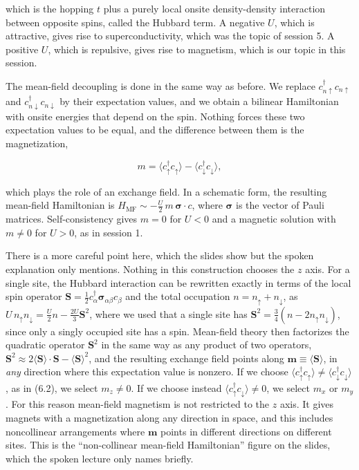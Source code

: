 which is the hopping $t$ plus a purely local onsite density-density interaction between opposite
spins, called the Hubbard term. A negative $U$, which is attractive, gives rise to superconductivity,
which was the topic of session 5. A positive $U$, which is repulsive, gives rise to magnetism, which is
our topic in this session.

The mean-field decoupling is done in the same way as before. We replace
$c_{n\uparrow}^\dagger c_{n\uparrow}$ and $c_{n\downarrow}^\dagger c_{n\downarrow}$ by their
expectation values, and we obtain a bilinear Hamiltonian with onsite energies that depend on the spin.
Nothing forces these two expectation values to be equal, and the difference between them is the
magnetization,

\begin{equation}
m = \langle c_\uparrow^\dagger c_\uparrow\rangle - \langle c_\downarrow^\dagger c_\downarrow\rangle,
\end{equation}

which plays the role of an exchange field. In a schematic form, the resulting mean-field Hamiltonian is
$H_\text{MF} \sim -\tfrac{U}{2}\, m\, \boldsymbol\sigma\cdot c$, where $\boldsymbol\sigma$ is the
vector of Pauli matrices. Self-consistency gives $m=0$ for $U<0$ and a magnetic solution with
$m\neq 0$ for $U>0$, as in session 1.

There is a more careful point here, which the slides show but the spoken explanation only mentions.
Nothing in this construction chooses the $z$ axis. For a single site, the Hubbard interaction can be
rewritten exactly in terms of the local spin operator
$\mathbf{S} = \tfrac12 c_\alpha^\dagger \boldsymbol\sigma_{\alpha\beta} c_\beta$
and the total occupation $n = n_\uparrow + n_\downarrow$, as
$U\, n_\uparrow n_\downarrow = \tfrac{U}{2}n - \tfrac{2U}{3}\mathbf{S}^2$, where we used that a single site has
$\mathbf{S}^2=\tfrac34(n-2n_\uparrow n_\downarrow)$, since only a singly occupied site has a spin. Mean-field theory then factorizes the quadratic operator
$\mathbf{S}^2$ in the same way as any product of two operators, $\mathbf{S}^2 \approx
2\langle\mathbf{S}\rangle\cdot\mathbf{S} - \langle\mathbf{S}\rangle^2$, and the resulting exchange
field points along $\mathbf{m} \equiv \langle\mathbf{S}\rangle$, in \emph{any} direction where this
expectation value is nonzero. If we choose $\langle c_\uparrow^\dagger c_\uparrow\rangle \neq
\langle c_\downarrow^\dagger c_\downarrow\rangle$, as in (6.2), we select $m_z\neq 0$. If we choose
instead $\langle c_\uparrow^\dagger c_\downarrow\rangle \neq 0$, we select $m_x$ or $m_y$. For this
reason mean-field magnetism is not restricted to the $z$ axis. It gives magnets with a magnetization
along any direction in space, and this includes noncollinear arrangements where $\mathbf{m}$ points in
different directions on different sites. This is the ``non-collinear mean-field Hamiltonian'' figure
on the slides, which the spoken lecture only names briefly.

